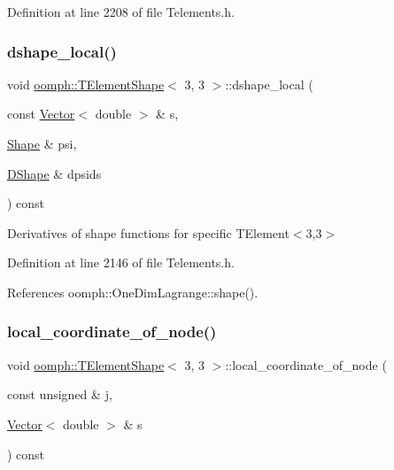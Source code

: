 Definition at line 2208 of file Telements.\+h.

\mbox{\label{classoomph_1_1TElementShape_3_013_00_013_01_4_afbc876a2d227fa59e156dffbac033812}} 
\subsubsection{\texorpdfstring{dshape\+\_\+local()}{dshape\_local()}}
{\footnotesize\ttfamily void \hyperlink{classoomph_1_1TElementShape}{oomph\+::\+T\+Element\+Shape}$<$ 3, 3 $>$\+::dshape\+\_\+local (\begin{DoxyParamCaption}\item[{const \hyperlink{classoomph_1_1Vector}{Vector}$<$ double $>$ \&}]{s,  }\item[{\hyperlink{classoomph_1_1Shape}{Shape} \&}]{psi,  }\item[{\hyperlink{classoomph_1_1DShape}{D\+Shape} \&}]{dpsids }\end{DoxyParamCaption}) const\hspace{0.3cm}{\ttfamily [inline]}}



Derivatives of shape functions for specific T\+Element$<$3,3$>$ 



Definition at line 2146 of file Telements.\+h.



References oomph\+::\+One\+Dim\+Lagrange\+::shape().

\mbox{\label{classoomph_1_1TElementShape_3_013_00_013_01_4_aaf503b5a7a9843fc49f71fea61ab14ce}} 
\subsubsection{\texorpdfstring{local\+\_\+coordinate\+\_\+of\+\_\+node()}{local\_coordinate\_of\_node()}}
{\footnotesize\ttfamily void \hyperlink{classoomph_1_1TElementShape}{oomph\+::\+T\+Element\+Shape}$<$ 3, 3 $>$\+::local\+\_\+coordinate\+\_\+of\+\_\+node (\begin{DoxyParamCaption}\item[{const unsigned \&}]{j,  }\item[{\hyperlink{classoomph_1_1Vector}{Vector}$<$ double $>$ \&}]{s }\end{DoxyParamCaption}) const\hspace{0.3cm}{\ttfamily [inline]}}



